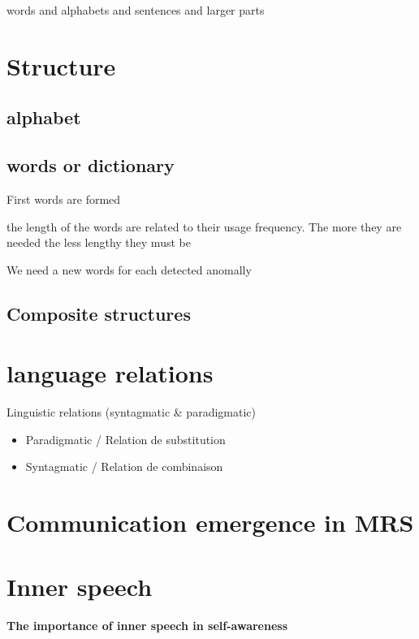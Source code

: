             words and alphabets and sentences and larger parts
            
        
        
    
\section{Structure}
    \subsection{alphabet}
    \subsection{words or dictionary}
        First words are formed
        
        the length of the words are related to their usage frequency. The more they are needed the less lengthy they must be
        
        We need a new words for each detected anomally
        
    \subsection{Composite structures}
    
    
    

\section{language relations}
    Linguistic relations (syntagmatic \& paradigmatic)
    \begin{itemize}
        \item Paradigmatic / Relation de substitution
        \item Syntagmatic / Relation de combinaison
    \end{itemize}

\section{Communication emergence in MRS}

\section{Inner speech}
    \textbf{The importance of inner speech in self-awareness} 

